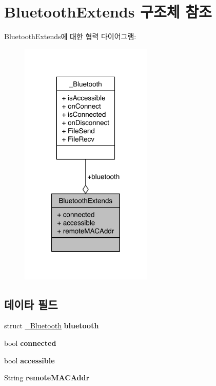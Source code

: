 \hypertarget{struct_bluetooth_extends}{\section{Bluetooth\-Extends 구조체 참조}
\label{struct_bluetooth_extends}
}


Bluetooth\-Extends에 대한 협력 다이어그램\-:\nopagebreak
\begin{figure}[H]
\begin{center}
\leavevmode
\includegraphics[width=179pt]{struct_bluetooth_extends__coll__graph}
\end{center}
\end{figure}
\subsection*{데이타 필드}
\begin{DoxyCompactItemize}
\item 
\hypertarget{struct_bluetooth_extends_afe4e56b7ac932d03957e2c38f209f55c}{struct \hyperlink{struct___bluetooth}{\-\_\-\-Bluetooth} {\bfseries bluetooth}}\label{struct_bluetooth_extends_afe4e56b7ac932d03957e2c38f209f55c}

\item 
\hypertarget{struct_bluetooth_extends_ab36823025f12a809217f7771125658c2}{bool {\bfseries connected}}\label{struct_bluetooth_extends_ab36823025f12a809217f7771125658c2}

\item 
\hypertarget{struct_bluetooth_extends_a348a5a495aba2753e3e5e5d013f1c612}{bool {\bfseries accessible}}\label{struct_bluetooth_extends_a348a5a495aba2753e3e5e5d013f1c612}

\item 
\hypertarget{struct_bluetooth_extends_a473f43fc5e8e19c1221c16e6fac3cb63}{String {\bfseries remote\-M\-A\-C\-Addr}}\label{struct_bluetooth_extends_a473f43fc5e8e19c1221c16e6fac3cb63}

\end{DoxyCompactItemize}


